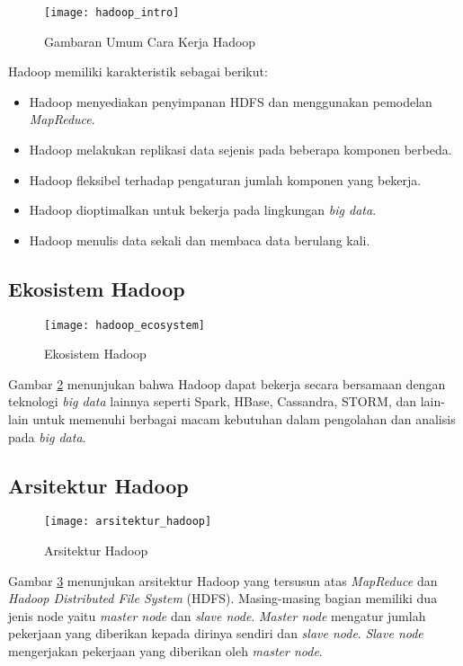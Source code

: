 \begin{figure}[H]
	\centering
	\texttt{[image: hadoop\_intro]}
	\caption{Gambaran Umum Cara Kerja Hadoop}
	\label{fig:hadoop_intro}
\end{figure}

\noindent Hadoop memiliki karakteristik sebagai berikut:
\begin{itemize}
\item Hadoop menyediakan penyimpanan HDFS dan menggunakan pemodelan \textit{MapReduce}.
\item Hadoop melakukan replikasi data sejenis pada beberapa komponen berbeda. 
\item Hadoop fleksibel terhadap pengaturan jumlah komponen yang bekerja.
\item Hadoop dioptimalkan untuk bekerja pada lingkungan \textit{big data}.
\item Hadoop menulis data sekali dan membaca data berulang kali.

\end{itemize}

\subsection{Ekosistem Hadoop}
\begin{figure}[H]
	\centering
	\texttt{[image: hadoop\_ecosystem]}
	\caption{Ekosistem Hadoop}
	\label{fig:hadoop_ecosystem}
\end{figure}
Gambar \ref{fig:hadoop_ecosystem} menunjukan bahwa Hadoop dapat bekerja secara bersamaan dengan teknologi \textit{big data} lainnya seperti Spark, HBase, Cassandra, STORM, dan lain-lain untuk memenuhi berbagai macam kebutuhan dalam pengolahan dan analisis pada \textit{big data}.

\subsection{Arsitektur Hadoop}
\begin{figure}[H]
	\centering
	\texttt{[image: arsitektur\_hadoop]}
	\caption{Arsitektur Hadoop}
	\label{fig:arsitektur_hadoop}
\end{figure}
Gambar \ref{fig:arsitektur_hadoop} menunjukan arsitektur Hadoop yang tersusun atas \textit{MapReduce} dan \textit{Hadoop Distributed File System} (HDFS). Masing-masing bagian memiliki dua jenis node yaitu \textit{master node} dan \textit{slave node}. \textit{Master node} mengatur jumlah pekerjaan yang diberikan kepada dirinya sendiri dan \textit{slave node}. \textit{Slave node} mengerjakan pekerjaan yang diberikan oleh \textit{master node}.


